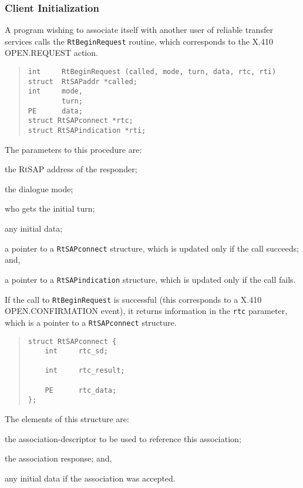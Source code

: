 \subsubsection     {Client Initialization}
A program wishing to associate itself with another user of reliable transfer
services calls the \verb"RtBeginRequest" routine,
which corresponds to the {\sf X.410 OPEN.REQUEST\/} action.
\begin{quote}\small\begin{verbatim}
int     RtBeginRequest (called, mode, turn, data, rtc, rti)
struct  RtSAPaddr *called;
int     mode,
        turn;
PE      data;
struct RtSAPconnect *rtc;
struct RtSAPindication *rti;
\end{verbatim}\end{quote}
The parameters to this procedure are:
\begin{describe}
\item[\verb"called":] the RtSAP address of the responder;

\item[\verb"mode":] the dialogue mode;

\item[\verb"turn":] who gets the initial turn;

\item[\verb"data":] any initial data;

\item[\verb"rtc":] a pointer to a \verb"RtSAPconnect" structure, which is
updated only if the call succeeds;
and,

\item[\verb"rti":] a pointer to a \verb"RtSAPindication" structure, which is
updated only if the call fails.
\end{describe}
If the call to \verb"RtBeginRequest" is successful
(this corresponds to a {\sf X.410 OPEN.CONFIRMATION\/} event),
it returns information in the \verb"rtc" parameter,
which is a pointer to a \verb"RtSAPconnect" structure.
\begin{quote}\small\begin{verbatim}
struct RtSAPconnect {
    int     rtc_sd;

    int     rtc_result;

    PE      rtc_data;
};
\end{verbatim}\end{quote}
The elements of this structure are:
\begin{describe}
\item[\verb"rtc\_sd":] the association-descriptor to be used to
reference this association;

\item[\verb"rtc\_result":] the association response;
and,

\item[\verb"rtc\_data":] any initial data if the association was accepted.
\end{describe}
